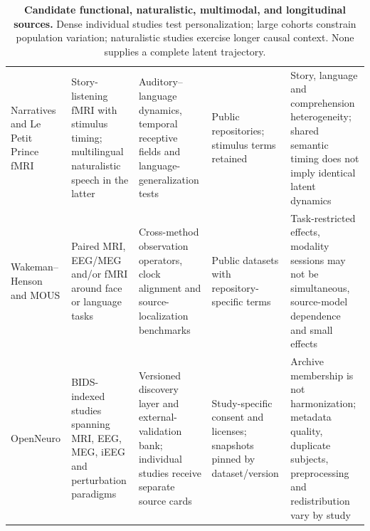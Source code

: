 \begin{table}[!h]
\begin{tabularx}{\textwidth}{@{}p{}p{}p{}p{}X@{}}
Narratives \citep{nastase2021narratives} and Le Petit Prince fMRI
\citep{li2022lpp} &
Story-listening fMRI with stimulus timing; multilingual naturalistic speech
in the latter &
Auditory--language dynamics, temporal receptive fields and
language-generalization tests &
Public repositories; stimulus terms retained &
Story, language and comprehension heterogeneity; shared semantic timing does
not imply identical latent dynamics\\

Wakeman--Henson \citep{wakeman2015} and MOUS
\citep{schoffelen2019mous} &
Paired MRI, EEG/MEG and/or fMRI around face or language tasks &
Cross-method observation operators, clock alignment and source-localization
benchmarks &
Public datasets with repository-specific terms &
Task-restricted effects, modality sessions may not be simultaneous,
source-model dependence and small effects\\

OpenNeuro &
BIDS-indexed studies spanning MRI, EEG, MEG, iEEG and perturbation paradigms &
Versioned discovery layer and external-validation bank; individual studies
receive separate source cards &
Study-specific consent and licenses; snapshots pinned by dataset/version &
Archive membership is not harmonization; metadata quality, duplicate
subjects, preprocessing and redistribution vary by study\\
\bottomrule
\end{tabularx}
\caption{\textbf{Candidate functional, naturalistic, multimodal, and
longitudinal sources.} Dense individual studies test personalization; large
cohorts constrain population variation; naturalistic studies exercise longer
causal context. None supplies a complete latent trajectory.}
\label{tab:appendix-functional}
\end{table}

